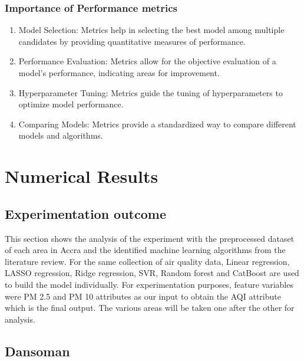 \documentclass{book}
\numberwithin{equation}{section}
\numberwithin{figure}{section}
\begin{document}
\vspace{-5mm} %
\subsection{Importance of Performance metrics}
\label{importance}
\vspace{-5mm} %
\begin{enumerate}
    \item Model Selection: Metrics help in selecting the best model among multiple candidates by providing quantitative measures of performance.
    \item Performance Evaluation: Metrics allow for the objective evaluation of a model’s performance, indicating areas for improvement.
    \item Hyperparameter Tuning: Metrics guide the tuning of hyperparameters to optimize model performance.
    \item Comparing Models: Metrics provide a standardized way to compare different models and algorithms.
\end{enumerate}
\chapter{Numerical Results}
\label{ch4}
\vspace{-5mm} %
\section{Experimentation outcome}
\label{experimentation}
\vspace{-5mm} %
This section shows the analysis of the experiment with the preprocessed dataset of each area in Accra and the identified machine learning algorithms from the literature review. For the same collection of air quality data, Linear regression, LASSO regression, Ridge regression, SVR, Random forest and CatBoost  are used to build the model individually. For experimentation purposes, feature variables were PM 2.5 and PM 10 attributes as our input to obtain the AQI attribute which is the final output. The various areas will be taken one after the other for analysis.
\vspace{-5mm} %
\section{Dansoman}
\label{dansoman}
\vspace{-5mm} %
\end{document}

